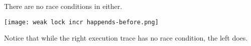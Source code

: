 \documentclass{report}
\begin{document}
There are no race conditions in either.
\\ \begin{minipage}{0.5 \textwidth}
\end{minipage}
\begin{minipage}{0.5 \textwidth}
\end{minipage}
\begin{center}
	\texttt{[image: weak lock incr happends-before.png]}
\end{center}
Notice that while the right execution trace has no race condition, the left does.
\end{document}
